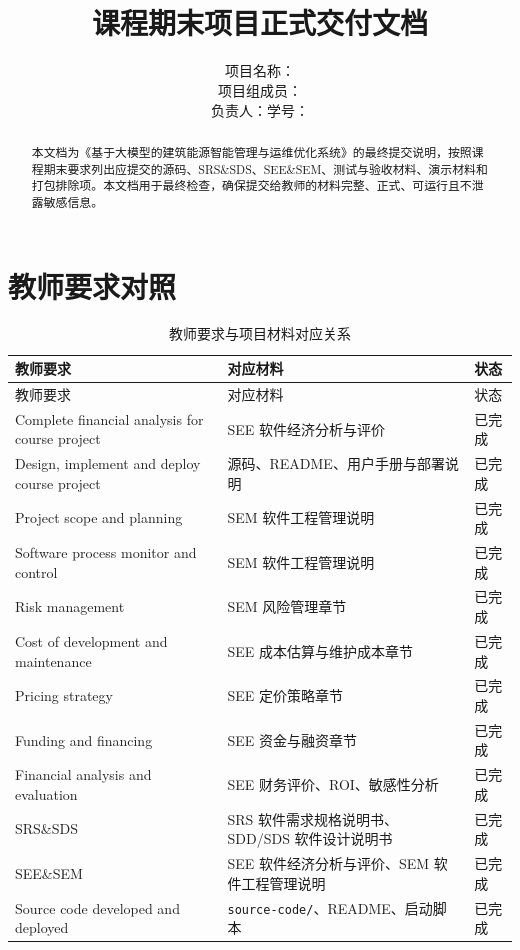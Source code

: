 \documentclass[12pt,a4paper]{ctexart}
\title{
    \vspace{-2em}
    \heiti \zihao{2} \reporttitle \\
    \vspace{1em}
    \zihao{4} 课程期末项目正式交付文档
}
\author{
    \songti \zihao{4}
    项目名称：\projectname \\
    项目组成员：\teamname \\
    负责人：\studentname \quad 学号：\studentid
}
\date{\docdate}
\newcommand{\projectname}{基于大模型的建筑能源智能管理与运维优化系统}
\newcommand{\code}[1]{{\footnotesize\nolinkurl{#1}}}
\begin{document}
\maketitle
\thispagestyle{fancy}

\begin{abstract}
本文档为《\projectname》的最终提交说明，按照课程期末要求列出应提交的源码、SRS\&SDS、SEE\&SEM、测试与验收材料、演示材料和打包排除项。本文档用于最终检查，确保提交给教师的材料完整、正式、可运行且不泄露敏感信息。
\end{abstract}

\tableofcontents
\newpage

\section{教师要求对照}
\begin{longtable}{p{5cm}p{5.2cm}p{3.2cm}}
\caption{教师要求与项目材料对应关系}\\
\toprule
教师要求 & 对应材料 & 状态 \\
\midrule
\endfirsthead
\toprule
教师要求 & 对应材料 & 状态 \\
\midrule
\endhead
Complete financial analysis for course project & SEE 软件经济分析与评价 & 已完成 \\
Design, implement and deploy course project & 源码、README、用户手册与部署说明 & 已完成 \\
Project scope and planning & SEM 软件工程管理说明 & 已完成 \\
Software process monitor and control & SEM 软件工程管理说明 & 已完成 \\
Risk management & SEM 风险管理章节 & 已完成 \\
Cost of development and maintenance & SEE 成本估算与维护成本章节 & 已完成 \\
Pricing strategy & SEE 定价策略章节 & 已完成 \\
Funding and financing & SEE 资金与融资章节 & 已完成 \\
Financial analysis and evaluation & SEE 财务评价、ROI、敏感性分析 & 已完成 \\
SRS\&SDS & SRS 软件需求规格说明书、SDD/SDS 软件设计说明书 & 已完成 \\
SEE\&SEM & SEE 软件经济分析与评价、SEM 软件工程管理说明 & 已完成 \\
Source code developed and deployed & \code{source-code/}、README、启动脚本 & 已完成 \\
\bottomrule
\end{longtable}
\end{document}
